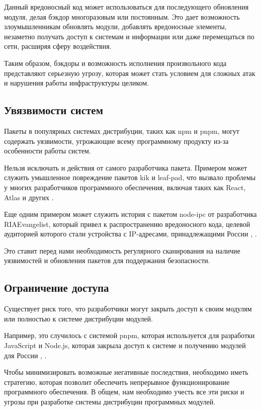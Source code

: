 Данный вредоносный код может использоваться для последующего обновления модуля, делая бэкдор многоразовым или постоянным. Это дает возможность злоумышленникам обновлять модули, добавлять вредоносные элементы, незаметно получать доступ к системам и информации или даже перемещаться по сети, расширяя сферу воздействия.

Таким образом, бэкдоры и возможность исполнения произвольного кода представляют серьезную угрозу, которая может стать условием для сложных атак и нарушения работы инфраструктуры целиком.

\subsection{Увязвимости систем}

Пакеты в популярных системах дистрибуции, таких как npm и pnpm, могут содержать уязвимости, угрожающие всему программному продукту из-за особенности работы систем. 

Нельзя исключать и действия от самого разработчика пакета. Примером может служить умышленное повреждение пакетов kik и leaf-pad, что вызвало проблемы у многих разработчиков программного обеспечения, включая таких как React, Atlas и других \cite{risk:remove-packages}.

Еще одним примером может служить история с пакетом node-ipc от разработчика RIAEvangelist, который привел к распространению вредоносного кода, целевой аудиторией которого стали устройства с IP-адресами, принадлежащими России \cite{risk:node-npc}, \cite{risk:node-npc-2}. 

Это ставит перед нами необходимость регулярного сканирования на наличие уязвимостей и обновления пакетов для поддержания безопасности.

\subsection{Ограничение доступа}

Существует риск того, что разработчики могут закрыть доступ к своим модулям или полностью к системе дистрибуции модулей.

Например, это случилось с системой pnpm, которая используется для разработки JavaScript и Node.js, которая закрыла доступ к системе и получению модулей для России \cite{risk:pnpm_block_1}, \cite{risk:pnpm_block_2}. 

Чтобы минимизировать возможные негативные последствия, необходимо иметь стратегию, которая позволит обеспечить непрерывное функционирование программного обеспечения. В общем, нам необходимо учесть все эти риски и угрозы при разработке системы дистрибуции программных модулей. 

